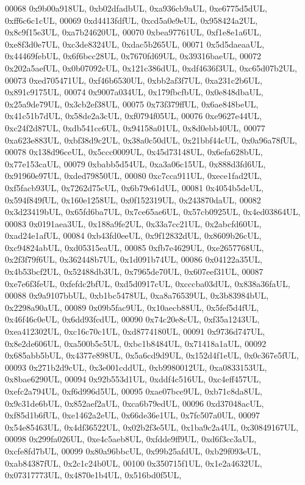 \begin{DoxyCode}
00068     0x9b00a918UL, 0xb02dfadbUL, 0xa936cb9aUL, 0xe6775d5dUL, 0xff6c6c1cUL,
00069     0xd4413fdfUL, 0xcd5a0e9eUL, 0x958424a2UL, 0x8c9f15e3UL, 0xa7b24620UL,
00070     0xbea97761UL, 0xf1e8e1a6UL, 0xe8f3d0e7UL, 0xc3de8324UL, 0xdac5b265UL,
00071     0x5d5daeaaUL, 0x44469febUL, 0x6f6bcc28UL, 0x7670fd69UL, 0x39316baeUL,
00072     0x202a5aefUL, 0x0b07092cUL, 0x121c386dUL, 0xdf4636f3UL, 0xc65d07b2UL,
00073     0xed705471UL, 0xf46b6530UL, 0xbb2af3f7UL, 0xa231c2b6UL, 0x891c9175UL,
00074     0x9007a034UL, 0x179fbcfbUL, 0x0e848dbaUL, 0x25a9de79UL, 0x3cb2ef38UL,
00075     0x73f379ffUL, 0x6ae848beUL, 0x41c51b7dUL, 0x58de2a3cUL, 0xf0794f05UL,
00076     0xe9627e44UL, 0xc24f2d87UL, 0xdb541cc6UL, 0x94158a01UL, 0x8d0ebb40UL,
00077     0xa623e883UL, 0xbf38d9c2UL, 0x38a0c50dUL, 0x21bbf44cUL, 0x0a96a78fUL,
00078     0x138d96ceUL, 0x5ccc0009UL, 0x45d73148UL, 0x6efa628bUL, 0x77e153caUL,
00079     0xbabb5d54UL, 0xa3a06c15UL, 0x888d3fd6UL, 0x91960e97UL, 0xded79850UL,
00080     0xc7cca911UL, 0xece1fad2UL, 0xf5facb93UL, 0x7262d75cUL, 0x6b79e61dUL,
00081     0x4054b5deUL, 0x594f849fUL, 0x160e1258UL, 0x0f152319UL, 0x243870daUL,
00082     0x3d23419bUL, 0x65fd6ba7UL, 0x7ce65ae6UL, 0x57cb0925UL, 0x4ed03864UL,
00083     0x0191aea3UL, 0x188a9fe2UL, 0x33a7cc21UL, 0x2abcfd60UL, 0xad24e1afUL,
00084     0xb43fd0eeUL, 0x9f12832dUL, 0x8609b26cUL, 0xc94824abUL, 0xd05315eaUL,
00085     0xfb7e4629UL, 0xe2657768UL, 0x2f3f79f6UL, 0x362448b7UL, 0x1d091b74UL,
00086     0x04122a35UL, 0x4b53bcf2UL, 0x52488db3UL, 0x7965de70UL, 0x607eef31UL,
00087     0xe7e6f3feUL, 0xfefdc2bfUL, 0xd5d0917cUL, 0xcccba03dUL, 0x838a36faUL,
00088     0x9a9107bbUL, 0xb1bc5478UL, 0xa8a76539UL, 0x3b83984bUL, 0x2298a90aUL,
00089     0x09b5fac9UL, 0x10aecb88UL, 0x5fef5d4fUL, 0x46f46c0eUL, 0x6dd93fcdUL,
00090     0x74c20e8cUL, 0xf35a1243UL, 0xea412302UL, 0xc16c70c1UL, 0xd8774180UL,
00091     0x9736d747UL, 0x8e2de606UL, 0xa500b5c5UL, 0xbc1b8484UL, 0x71418a1aUL,
00092     0x685abb5bUL, 0x4377e898UL, 0x5a6cd9d9UL, 0x152d4f1eUL, 0x0c367e5fUL,
00093     0x271b2d9cUL, 0x3e001cddUL, 0xb9980012UL, 0xa0833153UL, 0x8bae6290UL,
00094     0x92b553d1UL, 0xddf4c516UL, 0xc4eff457UL, 0xefc2a794UL, 0xf6d996d5UL,
00095     0xae07bce9UL, 0xb71c8da8UL, 0x9c31de6bUL, 0x852aef2aUL, 0xca6b79edUL,
00096     0xd37048acUL, 0xf85d1b6fUL, 0xe1462a2eUL, 0x66de36e1UL, 0x7fc507a0UL,
00097     0x54e85463UL, 0x4df36522UL, 0x02b2f3e5UL, 0x1ba9c2a4UL, 0x30849167UL,
00098     0x299fa026UL, 0xe4c5aeb8UL, 0xfdde9ff9UL, 0xd6f3cc3aUL, 0xcfe8fd7bUL,
00099     0x80a96bbcUL, 0x99b25afdUL, 0xb29f093eUL, 0xab84387fUL, 0x2c1c24b0UL,
00100     0x350715f1UL, 0x1e2a4632UL, 0x07317773UL, 0x4870e1b4UL, 0x516bd0f5UL,

\end{DoxyCode}
